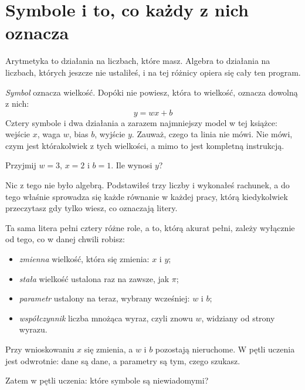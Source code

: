 \section{Symbole i to, co każdy z nich oznacza}
\label{sec:F02-symbols}

\begin{fr}
Arytmetyka to działania na liczbach, które masz. Algebra to działania na
liczbach, których jeszcze nie ustaliłeś, i na tej różnicy opiera się cały ten
program.

\emph{Symbol} oznacza wielkość. Dopóki nie powiesz, która to wielkość, oznacza
dowolną z nich:
\[ y = wx + b \]
Cztery symbole i dwa działania \dash{} a zarazem najmniejszy model w tej
książce: wejście $x$, waga $w$, bias $b$, wyjście $y$. Zauważ, czego ta linia
nie mówi. Nie mówi, czym jest którakolwiek z tych wielkości, a mimo to jest
kompletną instrukcją.

Przyjmij $w = 3$, $x = 2$ i $b = 1$. Ile wynosi $y$?
\nextframe
\end{fr}

\begin{fr}
Nic z tego nie było algebrą. Podstawiłeś trzy liczby i wykonałeś rachunek, a do
tego właśnie sprowadza się każde równanie w każdej pracy, którą kiedykolwiek
przeczytasz \dash{} gdy tylko wiesz, co oznaczają litery.

Ta sama litera pełni cztery różne role, a to, którą akurat pełni, zależy
wyłącznie od tego, co w danej chwili robisz:

\begin{itemize}
\item \emph{zmienna} \dash{} wielkość, która się zmienia: $x$ i $y$;
\item \emph{stała} \dash{} wielkość ustalona raz na zawsze, jak $\pi$;
\item \emph{parametr} \dash{} ustalony na teraz, wybrany wcześniej: $w$ i $b$;
\item \emph{współczynnik} \dash{} liczba mnożąca wyraz, czyli znowu $w$,
  widziany od strony wyrazu.
\end{itemize}

Przy wnioskowaniu $x$ się zmienia, a $w$ i $b$ pozostają nieruchome. W pętli
uczenia jest odwrotnie: dane są dane, a parametry są tym, czego szukasz.

Zatem w pętli uczenia: które symbole są niewiadomymi?
\nextframe
\end{fr}


